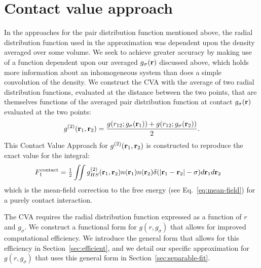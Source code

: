 \section{Contact value approach}
In the approaches for the pair distribution function
mentioned above, the radial distribution function used in the
approximation was dependent upon the density averaged over some
volume.  We seek to achieve greater accuracy by making use of a
function dependent upon our averaged $g_{\sigma}(\textbf{r})$ discussed
above, which holds more information about an inhomogeneous system than
does a simple convolution of the density.
%
We construct the CVA with the average of two radial distribution
functions, evaluated at the distance between the two points, that are
themselves functions of the averaged pair distribution function at contact
$g_{\sigma}(\textbf{r})$ evaluated at the two points:
\begin{align}
  g^{(2)}(\textbf{r}_1,\textbf{r}_2) = \frac{g(r_{12}; g_\sigma(\textbf{r}_1)) +
    g(r_{12}; g_\sigma(\textbf{r}_2))}{2}. \label{eq:g2-our-mean}
\end{align}
This Contact Value Approach for $g^{(2)}(\textbf{r}_1,\textbf{r}_2)$ is
constructed to reproduce the exact value for the integral:
\begin{align}
  F_1^{\text{contact}} &= \tfrac12 \iint
  g^{(2)}_{HS}(\textbf{r}_1,\textbf{r}_2)n(\textbf{r}_1)n(\textbf{r}_2)\delta(|\textbf{r}_1-\textbf{r}_2|-\sigma)
  d\textbf{r}_1d\textbf{r}_2
  \label{eq:mean-field-contact}
\end{align}
which is the mean-field correction to the free energy (see
Eq.~\ref{eq:mean-field}) for a purely contact interaction.

The CVA requires the radial distribution function expressed as a
function of $r$ and $g_\sigma$.
%
%
We construct a functional form for $g(r, g_\sigma)$ that allows for
improved computational efficiency.  We introduce the general form that
allows for this efficiency in Section~\ref{sec:efficient}, and we
detail our specific approximation for $g(r,g_\sigma)$ that uses this
general form in Section~\ref{sec:separable-fit}.
%



